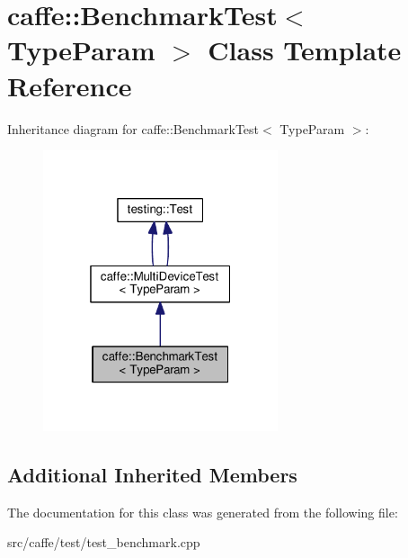 \hypertarget{classcaffe_1_1_benchmark_test}{}\section{caffe\+:\+:Benchmark\+Test$<$ Type\+Param $>$ Class Template Reference}
\label{classcaffe_1_1_benchmark_test}


Inheritance diagram for caffe\+:\+:Benchmark\+Test$<$ Type\+Param $>$\+:
\nopagebreak
\begin{figure}[H]
\begin{center}
\leavevmode
\includegraphics[width=196pt]{classcaffe_1_1_benchmark_test__inherit__graph}
\end{center}
\end{figure}
\subsection*{Additional Inherited Members}


The documentation for this class was generated from the following file\+:\begin{DoxyCompactItemize}
\item 
src/caffe/test/test\+\_\+benchmark.\+cpp\end{DoxyCompactItemize}
